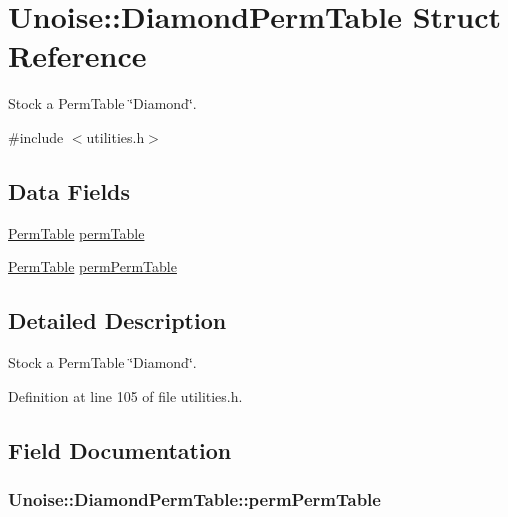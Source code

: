 \hypertarget{struct_unoise_1_1_diamond_perm_table}{\section{Unoise\-:\-:Diamond\-Perm\-Table Struct Reference}
\label{struct_unoise_1_1_diamond_perm_table}
}


Stock a Perm\-Table \char`\"{}\-Diamond\char`\"{}.  




{\ttfamily \#include $<$utilities.\-h$>$}

\subsection*{Data Fields}
\begin{DoxyCompactItemize}
\item 
\hyperlink{namespace_unoise_ae11142038f2dd1bea2711b2b99bbfaf6}{Perm\-Table} \hyperlink{struct_unoise_1_1_diamond_perm_table_abbdd2c631912b46dd642a1742fafc2cc}{perm\-Table}
\item 
\hyperlink{namespace_unoise_ae11142038f2dd1bea2711b2b99bbfaf6}{Perm\-Table} \hyperlink{struct_unoise_1_1_diamond_perm_table_a5445920a0bda0d71a2523175fb125df4}{perm\-Perm\-Table}
\end{DoxyCompactItemize}


\subsection{Detailed Description}
Stock a Perm\-Table \char`\"{}\-Diamond\char`\"{}. 

Definition at line 105 of file utilities.\-h.



\subsection{Field Documentation}
\hypertarget{struct_unoise_1_1_diamond_perm_table_a5445920a0bda0d71a2523175fb125df4}{
\subsubsection[{perm\-Perm\-Table}]{ Unoise\-::\-Diamond\-Perm\-Table\-::perm\-Perm\-Table}}\label{struct_unoise_1_1_diamond_perm_table_a5445920a0bda0d71a2523175fb125df4}



